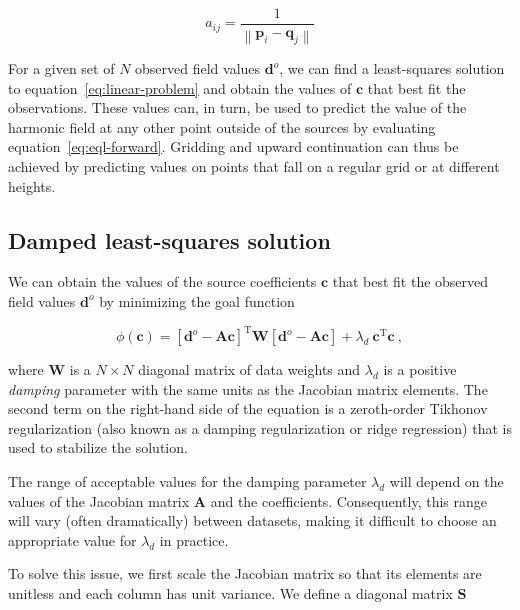\documentclass[twocolumn]{article}
\newcommand{\trans}{^{\text{T}}}
\begin{document}
\begin{equation}
    a_{ij} = \frac{1}{\left\lVert\mathbf{p}_i - \mathbf{q}_j\right\rVert}
\end{equation}

For a given set of $N$ observed field values $\mathbf{d}^o$,
we can find a least-squares solution to
equation~\ref{eq:linear-problem} and obtain the values of
$\mathbf{c}$ that best fit the observations.
These values can, in turn, be used to predict the value of the harmonic field
at any other point outside of the sources by evaluating
equation~\ref{eq:eql-forward}.
Gridding and upward continuation can thus be achieved by predicting values on
points that fall on a regular grid or at different heights.


\subsection{Damped least-squares solution}
\label{sec:eql-inversion}

We can obtain the values of the source coefficients $\mathbf{c}$ that best
fit the observed field values $\mathbf{d}^o$ by minimizing the goal function

\begin{equation}
    \phi(\mathbf{c}) =
    \left[\mathbf{d}^o - \mathbf{A}\mathbf{c}\right]\trans
    \mathbf{W}
    \left[\mathbf{d}^o - \mathbf{A}\mathbf{c}\right]
    + \lambda_d\ \mathbf{c}\trans\mathbf{c}
    \ ,
    \label{eq:misfit-unscaled}
\end{equation}

\noindent where
$\mathbf{W}$ is a $N \times N$ diagonal matrix of data weights and
$\lambda_d$ is a positive \emph{damping} parameter with the same units as the
Jacobian matrix elements.
The second term on the right-hand side of the equation is a zeroth-order
Tikhonov regularization \citep{tikhonov1977} (also known as a damping
regularization or ridge regression) that is used to stabilize the solution.

The range of acceptable values for the damping parameter $\lambda_d$ will
depend on the values of the Jacobian matrix $\mathbf{A}$ and the coefficients.
Consequently, this range will vary (often dramatically) between datasets,
making it difficult to choose an appropriate value for $\lambda_d$ in practice.

To solve this issue, we first scale the Jacobian matrix so that its elements
are unitless and each column has unit variance.
We define a diagonal matrix $\mathbf{S}$
\end{document}
